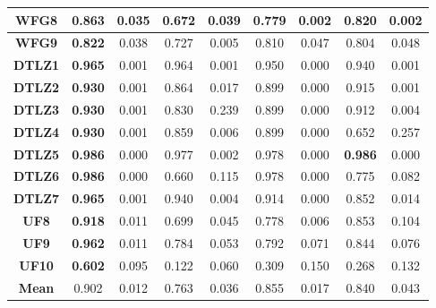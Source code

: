 \begin{table*}[t]
\begin{tabular}{cc|c|c|c|c|c|c|c}
\multicolumn{1}{c|}{\textbf{WFG8}}  & \textbf{0.863}      & 0.035            & 0.672             & 0.039           & 0.779              & 0.002           & 0.820              & 0.002            \\ \hline
\multicolumn{1}{c|}{\textbf{WFG9}}  & \textbf{0.822}      & 0.038            & 0.727             & 0.005           & 0.810              & 0.047           & 0.804              & 0.048            \\ \hline
\multicolumn{1}{c|}{\textbf{DTLZ1}} & \textbf{0.965}      & 0.001            & 0.964             & 0.001           & 0.950              & 0.000           & 0.940              & 0.001            \\ \hline
\multicolumn{1}{c|}{\textbf{DTLZ2}} & \textbf{0.930}      & 0.001            & 0.864             & 0.017           & 0.899              & 0.000           & 0.915              & 0.001            \\ \hline
\multicolumn{1}{c|}{\textbf{DTLZ3}} & \textbf{0.930}      & 0.001            & 0.830             & 0.239           & 0.899              & 0.000           & 0.912              & 0.004            \\ \hline
\multicolumn{1}{c|}{\textbf{DTLZ4}} & \textbf{0.930}      & 0.001            & 0.859             & 0.006           & 0.899              & 0.000           & 0.652              & 0.257            \\ \hline
\multicolumn{1}{c|}{\textbf{DTLZ5}} & \textbf{0.986}      & 0.000            & 0.977             & 0.002           & 0.978              & 0.000           & \textbf{0.986}     & 0.000            \\ \hline
\multicolumn{1}{c|}{\textbf{DTLZ6}} & \textbf{0.986}      & 0.000            & 0.660             & 0.115           & 0.978              & 0.000           & 0.775              & 0.082            \\ \hline
\multicolumn{1}{c|}{\textbf{DTLZ7}} & \textbf{0.965}      & 0.001            & 0.940             & 0.004           & 0.914              & 0.000           & 0.852              & 0.014            \\ \hline
\multicolumn{1}{c|}{\textbf{UF8}}   & \textbf{0.918}      & 0.011            & 0.699             & 0.045           & 0.778              & 0.006           & 0.853              & 0.104            \\ \hline
\multicolumn{1}{c|}{\textbf{UF9}}   & \textbf{0.962}      & 0.011            & 0.784             & 0.053           & 0.792              & 0.071           & 0.844              & 0.076            \\ \hline
\multicolumn{1}{c|}{\textbf{UF10}}  & \textbf{0.602}      & 0.095            & 0.122             & 0.060           & 0.309              & 0.150           & 0.268              & 0.132            \\ \hline
\multicolumn{1}{c|}{\textbf{Mean}}  & 0.902               & 0.012            & 0.763             & 0.036           & 0.855              & 0.017           & 0.840              & 0.043            \\ \hline
\end{tabular}%
\end{table*}
